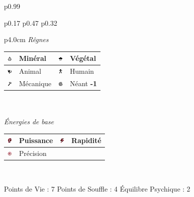 \documentclass[11pt,twoside,a4paper]{article}
\def\imgMINER{\includegraphics[width=0.25cm]{../../../../../imgGraphics/rolePlayingGame/SimulacreS/mini12x12/mineral.png} }
\def\imgVEGET{\includegraphics[width=0.25cm]{../../../../../imgGraphics/rolePlayingGame/SimulacreS/mini12x12/vegetal.png} }
\def\imgANIMA{\includegraphics[width=0.25cm]{../../../../../imgGraphics/rolePlayingGame/SimulacreS/mini12x12/animal.png} }
\def\imgHUMAI{\includegraphics[width=0.25cm]{../../../../../imgGraphics/rolePlayingGame/SimulacreS/mini12x12/humain.png} }
\def\imgMECAN{\includegraphics[width=0.25cm]{../../../../../imgGraphics/rolePlayingGame/SimulacreS/mini12x12/mecanique.png} }
\def\imgNEANT{\includegraphics[width=0.25cm]{../../../../../imgGraphics/rolePlayingGame/SimulacreS/mini12x12/neant.png} }
\def\imgPUISS{\includegraphics[width=0.25cm]{../../../../../imgGraphics/rolePlayingGame/SimulacreS/mini12x12/puissance.png} }
\def\imgRAPID{\includegraphics[width=0.25cm]{../../../../../imgGraphics/rolePlayingGame/SimulacreS/mini12x12/rapidite.png} }
\def\imgPRECI{\includegraphics[width=0.25cm]{../../../../../imgGraphics/rolePlayingGame/SimulacreS/mini12x12/precision.png} }
\begin{document}
\begin{longtable}[ht]{ p{} }
\begin{tabular}[h]{ p{} p{} p{} }
			\begin{tabular}[h]{ p{4.0cm} }
				\emph{R{\^e}gnes}  \\
				{\footnotesize %
				\begin{tabular}[h]{|p{0.25cm}|p{1.50cm}|p{0.25cm}|p{1.50cm}|}
					\hline
					\imgMINER 	& Min{\'e}ral		\newline 0	 & \imgVEGET	& V{\'e}g{\'e}tal		\newline 0					\\
					\hline
					\imgANIMA 	& Animal			\newline 0	 & \imgHUMAI	& Humain				\newline 1					\\
					\hline
					\imgMECAN	& M{\'e}canique		\newline 2	 & \imgNEANT	& N{\'e}ant				\newline \textbf{-1}		\\ 
					\hline
				\end{tabular} } \\
				\\
				\emph{{\'E}nergies de base} \\
				{\footnotesize %
				\begin{tabular}[h]{|p{0.25cm}|p{1.50cm}|p{0.25cm}|p{1.50cm}|}
					\hline
					\imgPUISS	& Puissance			\newline 2	 & \imgRAPID	& Rapidit{\'e}			\newline 0				\\
					\hline
					\imgPRECI	& Pr{\'e}cision		\newline 0	 &				&												\\
					\hline
				\end{tabular} } \\
			\end{tabular}
			\newline \newline \newline 
			Points de Vie : 7			\newline
			Points de Souffle : 4		\newline
			{\'E}quilibre Psychique : 2	\newline
		\\ %

\end{tabular}
\end{longtable}
\end{document}
